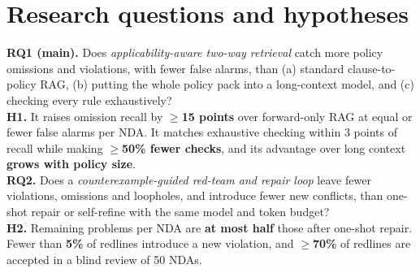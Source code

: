 \documentclass[11pt,a4paper]{article}
\begin{document}
\section{Research questions and hypotheses}
\begin{keybox}
\textbf{RQ1 (main).} Does \emph{applicability-aware two-way retrieval} catch more policy omissions and violations, with fewer false alarms, than (a) standard clause-to-policy RAG, (b) putting the whole policy pack into a long-context model, and (c) checking every rule exhaustively?\\[2pt]
\textbf{H1.} It raises omission recall by \textbf{$\geq$15 points} over forward-only RAG at equal or fewer false alarms per NDA. It matches exhaustive checking within 3 points of recall while making \textbf{$\geq$50\% fewer checks}, and its advantage over long context \textbf{grows with policy size}.\\[4pt]
\textbf{RQ2.} Does a \emph{counterexample-guided red-team and repair loop} leave fewer violations, omissions and loopholes, and introduce fewer new conflicts, than one-shot repair or self-refine with the same model and token budget?\\[2pt]
\textbf{H2.} Remaining problems per NDA are \textbf{at most half} those after one-shot repair. Fewer than \textbf{5\%} of redlines introduce a new violation, and \textbf{$\geq$70\%} of redlines are accepted in a blind review of 50 NDAs.
\end{keybox}

\end{document}
